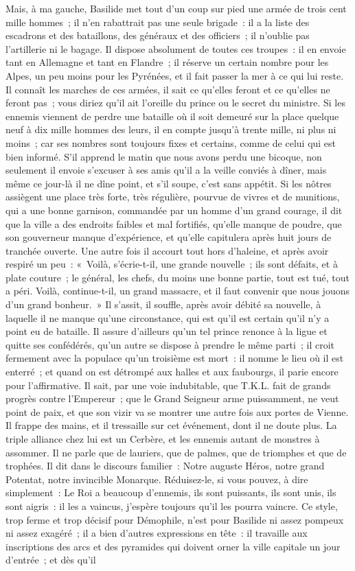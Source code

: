 \documentclass[french,twoside]{book} %
\begin{document}
Mais, à ma gauche, Basilide met tout d’un coup sur pied une armée de trois cent mille hommes ; il n’en rabattrait pas une seule brigade : il a la liste des escadrons et des bataillons, des généraux et des officiers ; il n’oublie pas l’artillerie ni le bagage. Il dispose absolument de toutes ces troupes : il en envoie tant en Allemagne et tant en Flandre ; il réserve un certain nombre pour les Alpes, un peu moins pour les Pyrénées, et il fait passer la mer à ce qui lui reste. Il connaît les marches de ces armées, il sait ce qu’elles feront et ce qu’elles ne feront pas ; vous diriez qu’il ait l’oreille du prince ou le secret du ministre. Si les ennemis viennent de perdre une bataille où il soit demeuré sur la place quelque neuf à dix mille hommes des leurs, il en compte jusqu’à trente mille, ni plus ni moins ; car ses nombres sont toujours fixes et certains, comme de celui qui est bien informé. S'il apprend le matin que nous avons perdu une bicoque, non seulement il envoie s’excuser à ses amis qu’il a la veille conviés à dîner, mais même ce jour-là il ne dîne point, et s’il soupe, c’est sans appétit. Si les nôtres assiègent une place très forte, très régulière, pourvue de vivres et de munitions, qui a une bonne garnison, commandée par un homme d’un grand courage, il dit que la ville a des endroits faibles et mal fortifiés, qu’elle manque de poudre, que son gouverneur manque d’expérience, et qu’elle capitulera après huit jours de tranchée ouverte. Une autre fois il accourt tout hors d’haleine, et après avoir respiré un peu : « Voilà, s’écrie-t-il, une grande nouvelle ; ils sont défaits, et à plate couture ; le général, les chefs, du moins une bonne partie, tout est tué, tout a péri. Voilà, continue-t-il, un grand massacre, et il faut convenir que nous jouons d’un grand bonheur. » Il s’assit, il souffle, après avoir débité sa nouvelle, à laquelle il ne manque qu’une circonstance, qui est qu’il est certain qu’il n’y a point eu de bataille. Il assure d’ailleurs qu’un tel prince renonce à la ligue et quitte ses confédérés, qu’un autre se dispose à prendre le même parti ; il croit fermement avec la populace qu’un troisième est mort : il nomme le lieu où il est enterré ; et quand on est détrompé aux halles et aux faubourgs, il parie encore pour l’affirmative. Il sait, par une voie indubitable, que T.K.L. fait de grands progrès contre l’Empereur ; que le Grand Seigneur arme puissamment, ne veut point de paix, et que son vizir va se montrer une autre fois aux portes de Vienne. Il frappe des mains, et il tressaille sur cet événement, dont il ne doute plus. La triple alliance chez lui est un Cerbère, et les ennemis autant de monstres à assommer. Il ne parle que de lauriers, que de palmes, que de triomphes et que de trophées. Il dit dans le discours familier : Notre auguste Héros, notre grand Potentat, notre invincible Monarque. Réduisez-le, si vous pouvez, à dire simplement : Le Roi a beaucoup d’ennemis, ils sont puissants, ils sont unis, ils sont aigris : il les a vaincus, j’espère toujours qu’il les pourra vaincre. Ce style, trop ferme et trop décisif pour Démophile, n’est pour Basilide ni assez pompeux ni assez exagéré ; il a bien d’autres expressions en tête : il travaille aux inscriptions des arcs et des pyramides qui doivent orner la ville capitale un jour d’entrée ; et dès qu’il 
\end{document}
